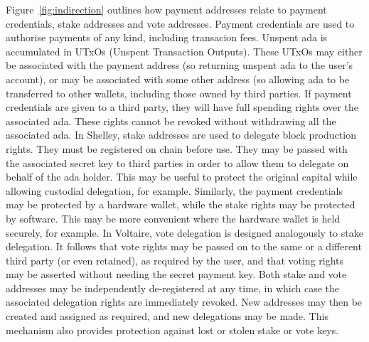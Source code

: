 Figure~\ref{fig:indirection} outlines how payment addresses relate to payment credentials, stake addresses  and vote addresses.  Payment credentials are used to
authorise payments of any kind, including transacion fees.  Unspent ada is accumulated in UTxOs (Unspent Transaction Outputs).  These UTxOs may either be associated
with the payment address (so returning unspent ada to the user's account), or may be associated with some other address (so allowing ada to be transferred to other wallets,
including those owned by third parties.  If payment credentials are given to a third party, they will have full spending rights over the associated ada.  These rights cannot be
revoked without withdrawing all the associated ada.
In Shelley, stake addresses are used to delegate block production rights.  They must be registered on chain before use.  They may be passed with the associated secret key to third parties
in order to allow them to delegate on behalf of the ada holder.  This may be useful to protect the original capital while allowing custodial delegation, for example.  Similarly,
the payment credentials may be protected by a hardware wallet, while the stake rights may be protected by software.  This may be more convenient where the hardware wallet is
held securely, for example.
In Voltaire, vote delegation is designed analogously to stake delegation.  It follows that vote rights may be passed on to the same or a different third party (or even retained), as required by the user,
and that voting rights may be asserted without needing the secret payment key.  Both stake and vote addresses may be independently de-registered at any time, in which case the associated delegation rights are immediately
revoked.  New addresses may then be created and assigned as required, and new delegations may be made.  This mechanism also provides protection against lost or stolen stake or vote keys.

